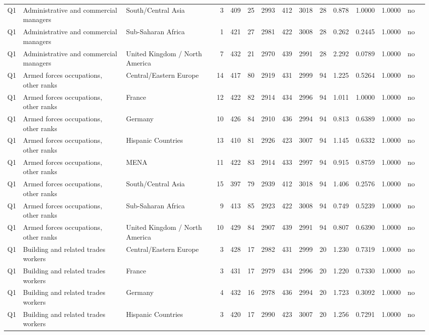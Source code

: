 \begin{longtable}{lllrcccccccccll}
Q1 & Administrative and commercial managers & South/Central Asia & 3 & 409 & 25 & 2993 & 412 & 3018 & 28 & 0.878 & 1.0000 & 1.0000 & no \\
Q1 & Administrative and commercial managers & Sub-Saharan Africa & 1 & 421 & 27 & 2981 & 422 & 3008 & 28 & 0.262 & 0.2445 & 1.0000 & no \\
Q1 & Administrative and commercial managers & United Kingdom / North America & 7 & 432 & 21 & 2970 & 439 & 2991 & 28 & 2.292 & 0.0789 & 1.0000 & no \\
Q1 & Armed forces occupations, other ranks & Central/Eastern Europe & 14 & 417 & 80 & 2919 & 431 & 2999 & 94 & 1.225 & 0.5264 & 1.0000 & no \\
Q1 & Armed forces occupations, other ranks & France & 12 & 422 & 82 & 2914 & 434 & 2996 & 94 & 1.011 & 1.0000 & 1.0000 & no \\
Q1 & Armed forces occupations, other ranks & Germany & 10 & 426 & 84 & 2910 & 436 & 2994 & 94 & 0.813 & 0.6389 & 1.0000 & no \\
Q1 & Armed forces occupations, other ranks & Hispanic Countries & 13 & 410 & 81 & 2926 & 423 & 3007 & 94 & 1.145 & 0.6332 & 1.0000 & no \\
Q1 & Armed forces occupations, other ranks & MENA & 11 & 422 & 83 & 2914 & 433 & 2997 & 94 & 0.915 & 0.8759 & 1.0000 & no \\
Q1 & Armed forces occupations, other ranks & South/Central Asia & 15 & 397 & 79 & 2939 & 412 & 3018 & 94 & 1.406 & 0.2576 & 1.0000 & no \\
Q1 & Armed forces occupations, other ranks & Sub-Saharan Africa & 9 & 413 & 85 & 2923 & 422 & 3008 & 94 & 0.749 & 0.5239 & 1.0000 & no \\
Q1 & Armed forces occupations, other ranks & United Kingdom / North America & 10 & 429 & 84 & 2907 & 439 & 2991 & 94 & 0.807 & 0.6390 & 1.0000 & no \\
Q1 & Building and related trades workers & Central/Eastern Europe & 3 & 428 & 17 & 2982 & 431 & 2999 & 20 & 1.230 & 0.7319 & 1.0000 & no \\
Q1 & Building and related trades workers & France & 3 & 431 & 17 & 2979 & 434 & 2996 & 20 & 1.220 & 0.7330 & 1.0000 & no \\
Q1 & Building and related trades workers & Germany & 4 & 432 & 16 & 2978 & 436 & 2994 & 20 & 1.723 & 0.3092 & 1.0000 & no \\
Q1 & Building and related trades workers & Hispanic Countries & 3 & 420 & 17 & 2990 & 423 & 3007 & 20 & 1.256 & 0.7291 & 1.0000 & no \\

\end{longtable}
